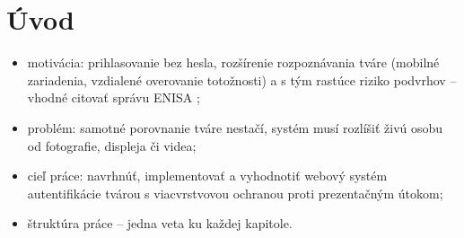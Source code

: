 \chapter{Úvod}

\begin{itemize}
  \item motivácia: prihlasovanie bez hesla, rozšírenie rozpoznávania tváre (mobilné
        zariadenia, vzdialené overovanie totožnosti) a s tým rastúce riziko podvrhov
        – vhodné citovať správu ENISA \cite{enisa2022remote};
  \item problém: samotné porovnanie tváre nestačí, systém musí rozlíšiť živú osobu od
        fotografie, displeja či videa;
  \item cieľ práce: navrhnúť, implementovať a vyhodnotiť webový systém autentifikácie
        tvárou s viacvrstvovou ochranou proti prezentačným útokom;
  \item štruktúra práce – jedna veta ku každej kapitole.
\end{itemize}
